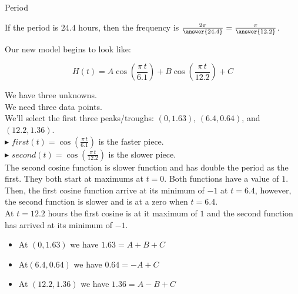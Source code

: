 \documentclass{ximera}
\begin{document}
\begin{question}  Period

If the period is $24.4$ hours, then the frequency is $\frac{2 \pi}{\answer{24.4}} = \frac{\pi}{\answer{12.2}}$.


\end{question}









Our new model begins to look like:

\[   H(t) = A \cos\left( \frac{\pi \, t}{6.1} \right) + B \cos\left( \frac{\pi \, t}{12.2} \right) + C       \]


We have three unknowns. \\

We need three data points. \\


We'll select the first three peaks/troughs:  $(0, 1.63)$, $(6.4, 0.64)$, and $(12.2, 1.36)$. \\



\textbf{\textcolor{blue!55!black}{$\blacktriangleright$}} $first(t) = \cos\left( \frac{\pi \, t}{6.1} \right)$ is the faster piece. \\


\textbf{\textcolor{blue!55!black}{$\blacktriangleright$}} $second(t) = \cos\left( \frac{\pi \, t}{12.2} \right)$ is the slower piece. \\




The second cosine function is slower function and has double the period as the first.  They both start at maximums at $t=0$.  Both functions have a value of $1$. \\

Then, the first cosine function arrive at its minimum of $-1$ at $t=6.4$, however, the second function is slower and is at a zero when $t=6.4$.  \\

At $t=12.2$ hours the first cosine is at it maximum of $1$ and the second function has arrived at its minimum of $-1$.






\begin{itemize}
\item At $(0, 1.63)$  we have $1.63 = A + B + C$
\item At$(6.4, 0.64)$ we have $0.64 = -A + C$
\item At $(12.2, 1.36)$  we have $1.36 = A - B + C$
\end{itemize}
\end{document}
